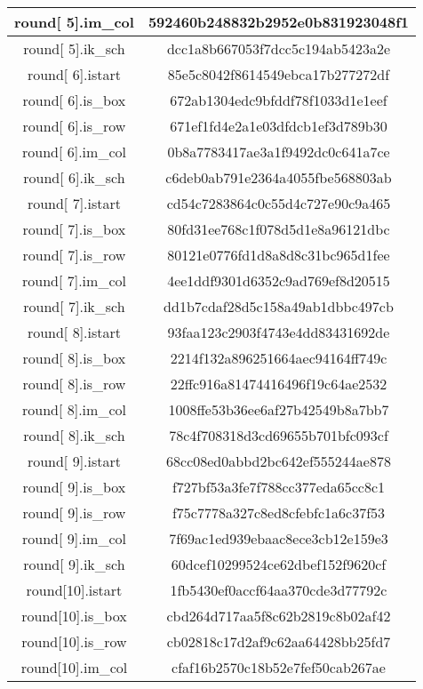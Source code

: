 \begin{center}
\begin{longtable}{|c|c|}
\hline
round[ 5].im\_col&   592460b248832b2952e0b831923048f1\\
\hline
round[ 5].ik\_sch&   dcc1a8b667053f7dcc5c194ab5423a2e\\
\hline
round[ 6].istart&   85e5c8042f8614549ebca17b277272df\\
\hline
round[ 6].is\_box&   672ab1304edc9bfddf78f1033d1e1eef\\
\hline
round[ 6].is\_row&   671ef1fd4e2a1e03dfdcb1ef3d789b30\\
\hline
round[ 6].im\_col&   0b8a7783417ae3a1f9492dc0c641a7ce\\
\hline
round[ 6].ik\_sch&   c6deb0ab791e2364a4055fbe568803ab\\
\hline
round[ 7].istart&   cd54c7283864c0c55d4c727e90c9a465\\
\hline
round[ 7].is\_box&   80fd31ee768c1f078d5d1e8a96121dbc\\
\hline
round[ 7].is\_row&   80121e0776fd1d8a8d8c31bc965d1fee\\
\hline
round[ 7].im\_col&   4ee1ddf9301d6352c9ad769ef8d20515\\
\hline
round[ 7].ik\_sch&   dd1b7cdaf28d5c158a49ab1dbbc497cb\\
\hline
round[ 8].istart&   93faa123c2903f4743e4dd83431692de\\
\hline
round[ 8].is\_box&   2214f132a896251664aec94164ff749c\\
\hline
round[ 8].is\_row&   22ffc916a81474416496f19c64ae2532\\
\hline
round[ 8].im\_col&   1008ffe53b36ee6af27b42549b8a7bb7\\
\hline
round[ 8].ik\_sch&   78c4f708318d3cd69655b701bfc093cf\\
\hline
round[ 9].istart&   68cc08ed0abbd2bc642ef555244ae878\\
\hline
round[ 9].is\_box&   f727bf53a3fe7f788cc377eda65cc8c1\\
\hline
round[ 9].is\_row&   f75c7778a327c8ed8cfebfc1a6c37f53\\
\hline
round[ 9].im\_col&   7f69ac1ed939ebaac8ece3cb12e159e3\\
\hline
round[ 9].ik\_sch&   60dcef10299524ce62dbef152f9620cf\\
\hline
round[10].istart&   1fb5430ef0accf64aa370cde3d77792c\\
\hline
round[10].is\_box&   cbd264d717aa5f8c62b2819c8b02af42\\
\hline
round[10].is\_row&   cb02818c17d2af9c62aa64428bb25fd7\\
\hline
round[10].im\_col&   cfaf16b2570c18b52e7fef50cab267ae\\

\end{longtable}
\end{center}
